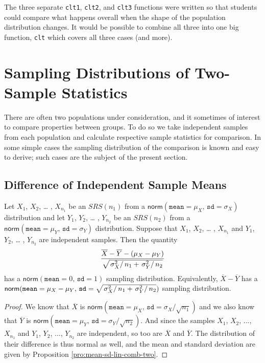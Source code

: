\documentclass[captions=tableheading]{scrbook}
\begin{document}
The three separate \texttt{clt1}, \texttt{clt2}, and \texttt{clt3} functions were written so that students could compare what happens overall when the shape of the population distribution changes. It would be possible to combine all three into one big function, \texttt{clt} which covers all three cases (and more). 
\section{Sampling Distributions of Two-Sample Statistics}
\label{sec-8-4}

\label{sec:Samp-Dist-Two-Samp}

There are often two populations under consideration, and it sometimes of interest to compare properties between groups. To do so we take independent samples from each population and calculate respective sample statistics for comparison. In some simple cases the sampling distribution of the comparison is known and easy to derive; such cases are the subject of the present section.
\subsection{Difference of Independent Sample Means}
\label{sec-8-4-1}


\begin{prop}
Let \(X_{1}\), \(X_{2}\), \ldots{} , \(X_{n_{1}}\) be an \(SRS(n_{1})\) from a \(\mathsf{norm}(\mathtt{mean}=\mu_{X},\,\mathtt{sd}=\sigma_{X})\) distribution and let \(Y_{1}\), \(Y_{2}\), \ldots{} , \(Y_{n_{2}}\) be an \(SRS(n_{2})\) from a \(\mathsf{norm}(\mathtt{mean}=\mu_{Y},\,\mathtt{sd}=\sigma_{Y})\) distribution. Suppose that \(X_{1}\), \(X_{2}\), \ldots{} , \(X_{n_{1}}\) and \(Y_{1}\), \(Y_{2}\), \ldots{} , \(Y_{n_{2}}\) are independent samples. Then the quantity
\begin{equation}
\frac{\overline{X}-\overline{Y}-(\mu_{X}-\mu_{Y})}{\sqrt{\left.\sigma_{X}^{2}\right\slash n_{1}+\left.\sigma_{Y}^{2}\right\slash n_{2}}}\label{eq:diff-indep-sample-means}\end{equation}
has a \(\mathsf{norm}(\mathtt{mean}=0,\,\mathtt{sd}=1)\) sampling distribution. Equivalently, \(\overline{X}-\overline{Y}\) has a \(\mathsf{norm}(\mathtt{mean}=\mu_{X}-\mu_{Y},\,\mathtt{sd}=\sqrt{\left.\sigma_{X}^{2}\right\slash n_{1}+\left.\sigma_{Y}^{2}\right\slash n_{2}})\) sampling distribution.
\end{prop}

\begin{proof}
We know that \(\overline{X}\) is \(\mathsf{norm}(\mathtt{mean}=\mu_{X},\,\mathtt{sd}=\sigma_{X}/\sqrt{n_{1}})\) and we also know that \(\overline{Y}\) is \(\mathsf{norm}(\mathtt{mean}=\mu_{Y},\,\mathtt{sd}=\sigma_{Y}/\sqrt{n_{2}})\). And since the samples \(X_{1}\), \(X_{2}\), ..., \(X_{n_{1}}\) and \(Y_{1}\), \(Y_{2}\), ..., \(Y_{n_{2}}\) are independent, so too are \(\overline{X}\) and \(\overline{Y}\). The distribution of their difference is thus normal as well, and the mean and standard deviation are given by Proposition \ref{pro:mean-sd-lin-comb-two}.
\end{proof}
\end{document}
